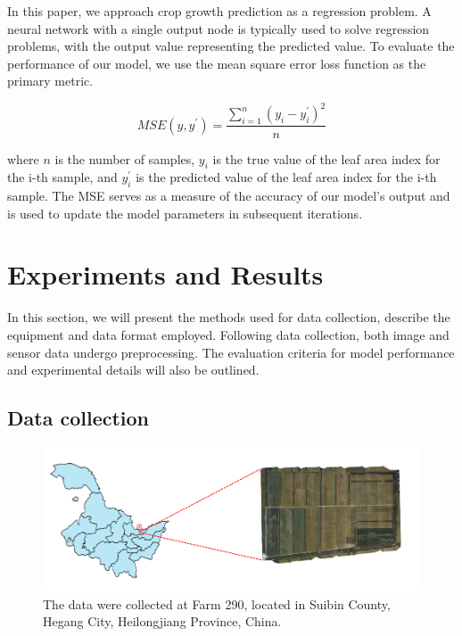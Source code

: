 \documentclass[acmsmall,manuscript, screen, review]{acmart}
\begin{document}
In this paper, we approach crop growth prediction as a regression problem. A neural network with a single output node is typically used to solve regression problems, with the output value representing the predicted value. To evaluate the performance of our model, we use the mean square error loss function as the primary metric.

\begin{equation}
  MSE\left(y,y^\prime\right)=\frac{\sum_{i=1}^{n}\left(y_i-y_i^\prime\right)^2}{n}
\end{equation}

where \begin{math}
  n
\end{math} is the number of samples, \begin{math}
  y_i
\end{math} is the true value of the leaf area index for the i-th sample, and \begin{math}
  y_i^\prime
\end{math} is the predicted value of the leaf area index for the i-th sample. The MSE serves as a measure of the accuracy of our model’s output and is used to update the model parameters in subsequent iterations.

\section{Experiments and Results}

In this section, we will present the methods used for data collection, describe the equipment and data format employed. Following data collection, both image and sensor data undergo preprocessing. The evaluation criteria for model performance and experimental details will also be outlined.


\subsection{Data collection}

\begin{figure}[htbp]
  \centering
  \includegraphics[width=\linewidth]{pic/farm_location.png}
  \caption{The data were collected at Farm 290, located in Suibin County, Hegang City, Heilongjiang Province, China.}
  \label{farm_location}
\end{figure}
\end{document}
